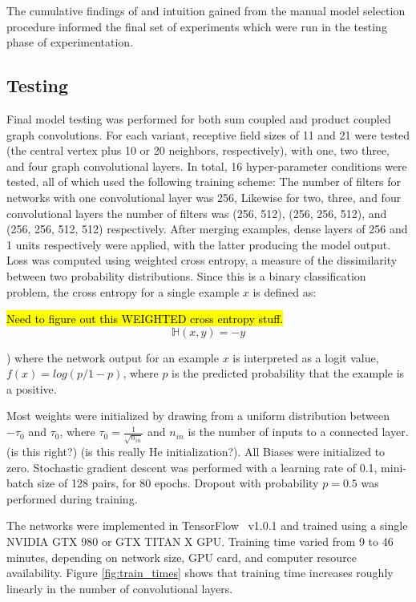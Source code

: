 The cumulative findings of and intuition gained from the manual model selection procedure informed the final set of experiments which were run in the testing phase of experimentation.

\subsection{Testing}

Final model testing was performed for both sum coupled and product coupled graph convolutions.
For each variant, receptive field sizes of 11 and 21 were tested (the central vertex plus 10 or 20 neighbors, respectively), with one, two three, and four graph convolutional layers. 
In total, 16 hyper-parameter conditions were tested, all of which used the following training scheme:
The number of filters for networks with one convolutional layer was 256, Likewise for two, three, and four convolutional layers the number of filters was (256, 512), (256, 256, 512), and (256, 256, 512, 512) respectively. 
After merging examples, dense layers of 256 and 1 units respectively were applied, with the latter producing the model output.
Loss was computed using weighted cross entropy, a measure of the dissimilarity between two probability distributions. 
Since this is a binary classification problem, the cross entropy for a single example $x$ is defined as: 

\hl{Need to figure out this WEIGHTED cross entropy stuff.}
\begin{equation}
\mathbb{H}(x, y) = - y 
\label{eq:weighted_ce}
\end{equation}

) where the network output for an example $x$ is interpreted as a logit value, $f(x)=log(p/{1-p})$, where $p$ is the predicted probability that the example is a positive.

Most weights were initialized by drawing from a uniform distribution between $-\tau_0$ and $\tau_0$, where $\tau_0=\frac{1}{\sqrt{n_{in}}}$ and $n_{in}$ is the number of inputs to a connected layer. (is this right?) (is this really He initialization?).
All Biases were initialized to zero.
Stochastic gradient descent was performed with a learning rate of 0.1, mini-batch size of 128 pairs, for 80 epochs. 
Dropout with probability $p=0.5$ was performed during training.

The networks were implemented in TensorFlow~\cite{abadi2015} v1.0.1 and trained using a single NVIDIA GTX 980 or GTX TITAN X GPU.
Training time varied from 9 to 46 minutes, depending on network size, GPU card, and computer resource availability.
Figure \ref{fig:train_times} shows that training time increases roughly linearly in the number of convolutional layers.

